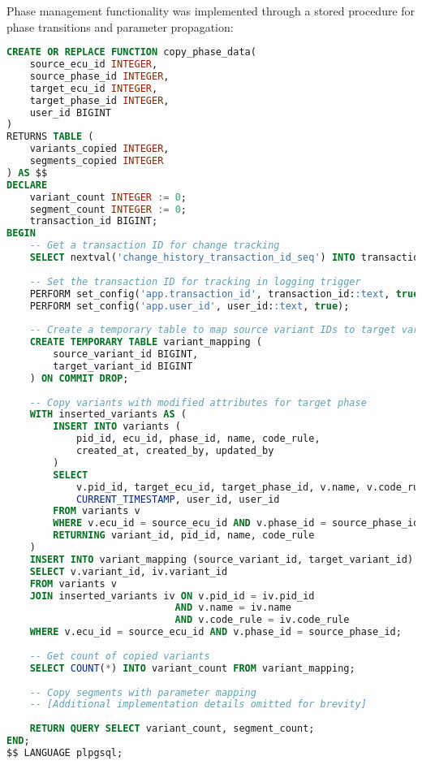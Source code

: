 Phase management functionality was implemented through a stored procedure for phase transitions and parameter propagation:

\begin{lstlisting}[language=SQL, caption={Phase Transition Function}, label={lst:phase-transition}]
CREATE OR REPLACE FUNCTION copy_phase_data(
    source_ecu_id INTEGER,
    source_phase_id INTEGER,
    target_ecu_id INTEGER,
    target_phase_id INTEGER,
    user_id BIGINT
)
RETURNS TABLE (
    variants_copied INTEGER,
    segments_copied INTEGER
) AS $$
DECLARE
    variant_count INTEGER := 0;
    segment_count INTEGER := 0;
    transaction_id BIGINT;
BEGIN
    -- Get a transaction ID for change tracking
    SELECT nextval('change_history_transaction_id_seq') INTO transaction_id;
    
    -- Set the transaction ID for tracking in logging trigger
    PERFORM set_config('app.transaction_id', transaction_id::text, true);
    PERFORM set_config('app.user_id', user_id::text, true);
    
    -- Create a temporary table to map source variant IDs to target variant IDs
    CREATE TEMPORARY TABLE variant_mapping (
        source_variant_id BIGINT,
        target_variant_id BIGINT
    ) ON COMMIT DROP;
    
    -- Copy variants with modified attributes for target phase
    WITH inserted_variants AS (
        INSERT INTO variants (
            pid_id, ecu_id, phase_id, name, code_rule, 
            created_at, created_by, updated_by
        )
        SELECT 
            v.pid_id, target_ecu_id, target_phase_id, v.name, v.code_rule,
            CURRENT_TIMESTAMP, user_id, user_id
        FROM variants v
        WHERE v.ecu_id = source_ecu_id AND v.phase_id = source_phase_id
        RETURNING variant_id, pid_id, name, code_rule
    )
    INSERT INTO variant_mapping (source_variant_id, target_variant_id)
    SELECT v.variant_id, iv.variant_id
    FROM variants v
    JOIN inserted_variants iv ON v.pid_id = iv.pid_id 
                             AND v.name = iv.name 
                             AND v.code_rule = iv.code_rule
    WHERE v.ecu_id = source_ecu_id AND v.phase_id = source_phase_id;
    
    -- Get count of copied variants
    SELECT COUNT(*) INTO variant_count FROM variant_mapping;
    
    -- Copy segments with parameter mapping
    -- [Additional implementation details omitted for brevity]
    
    RETURN QUERY SELECT variant_count, segment_count;
END;
$$ LANGUAGE plpgsql;
\end{lstlisting}

